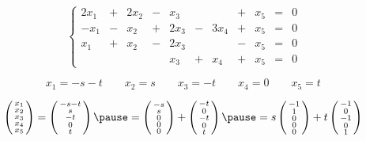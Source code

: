 \begin{frame}
\begin{exemple}
\[ \left\{
\begin{array}{ccccccccccc}
2x_1 &+ &2x_2 &- &x_3 &&&+ &x_5 & = & 0\\
-x_1 &- &x_2 &+ &2x_3 &- &3x_4 &+ &x_5 & = &0\\
x_1 &+ &x_2 &- &2x_3 &&&- &x_5 & = & 0\\
&&&&x_3 &+ &x_4 &+ &x_5 & = & 0
\end{array} \right.
\]
\pause

$$ x_1 = -s-t\qquad x_2 = s\qquad x_3 = -t\qquad x_4 = 0\qquad x_5 = t\, $$ 

\pause

$$ \left( \begin{smallmatrix} x_1\\x_2\\x_3\\x_4\\x_5\end{smallmatrix}\right) 
=  \left( \begin{smallmatrix} -s-t\\s\\-t\\ 0\\t\end{smallmatrix}\right) 
\pause
=  \left( \begin{smallmatrix} -s\\s\\0\\0\\0\end{smallmatrix}\right) 
+  \left( \begin{smallmatrix} -t\\0\\-t\\0\\t\end{smallmatrix}\right)
\pause
= s  \left( \begin{smallmatrix} -1\\1\\0\\0\\0\end{smallmatrix}\right) 
+ t \left( \begin{smallmatrix} -1\\0\\-1\\0\\1\end{smallmatrix}\right)\, $$

\end{exemple}
\end{frame}

